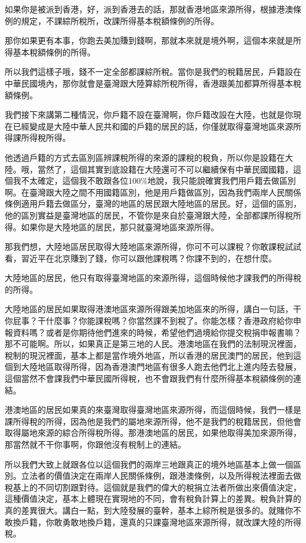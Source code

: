 \documentclass[oneside,sub3section]{ctexbook}
\begin{document}
如果你是被派到香港，好，派到香港去的話，那就香港地區來源所得，根據港澳條例的規定，不課綜所稅所，改課所得基本稅額條例的所得。

那你如果更有本事，你跑去美加賺到錢啊，那就本來就是境外啊，這個本來就是所得基本稅額條例的所得。

所以我們這樣子哦，錢不一定全部都課綜所稅。當你是我們的稅籍居民，戶籍設在中華民國境內，那你就會是臺灣跟大陸算綜所稅所得，香港跟美加都算所得基本稅額條例。

我們接下來講第二種情況，你戶籍不設在臺灣啊，你戶籍改設在大陸，也就是你現在已經變成是大陸中華人民共和國的戶籍的居民的話，你僅就取得臺灣地區來源所得課所得稅所得。

他透過戶籍的方式去區別區辨課稅所得的來源的課稅的稅負，所以你是設籍在大陸。哦，當然了，這個其實到底設籍在大陸還可不可以繼續保有中華民國國籍，這個我不太確定，這個我不敢跟各位100\%地說，我只能說確實我們用戶籍去做區別啊。在臺灣跟大陸之間不用國籍區別，他是用戶籍做區別，因為我們兩岸人民關係條例適用戶籍去做區分，臺灣的地區的居民跟大陸地區的居民。好，這個的區別，他的區別實益是臺灣地區的居民，不管你是來自於臺灣跟大陸，全部都課所得稅所得。如果你是大陸地區的居民，那只就臺灣地區來源所得。

那我們想，大陸地區居民取得大陸地區來源所得，你可不可以課稅？你敢課稅試試看，習近平在北京賺到了錢，你可以跟他課稅嗎？你課不到的，在想什麼。

大陸地區的居民，他只有取得臺灣地區的來源所得，這個時候他才課我們的所得稅的所得。

大陸地區的居民如果取得港澳地區來源所得跟美加地區來的所得，講白一句話，干你屁事？干什麼事？你能課稅嗎？你當然課不到稅了。你能怎樣？香港政府給你申報資料嗎？或者是你期待他們進來的時候，希望他們過境給你提交稅捐申報書嘛？那不可能啊。所以，如果真正是第三地的人民。港澳地區在我們的法制現況裡面，稅制的現況裡面，基本上都是當作境外地區，所以香港的居民澳門的居民，他到這個到大陸地區取得所得，因為香港澳門地區有很多人跑去他們北上進内陸去發展，這個當然不會課我們中華民國所得稅，也不會跟我們有什麼所得基本稅額條例的連結。

港澳地區的居民如果真的來臺灣取得臺灣地區來源所得，而這個時候，我們一樣是課所得稅的所得，因為他是我們的屬地來源所得，他不是我們的稅籍居民，但他會取得屬地來源的綜合所得稅所得。那港澳地區的居民，如果他取得美加來源所得，那當然就不干你事啊，你跟他沒有稅制上的連結。

所以我們大致上就跟各位以這個我們的兩岸三地跟真正的境外地區基本上做一個區別。立法者的價值決定在兩岸人民關係條例，跟港澳條例，以及所得稅法裡面去做稅基上的不同切割跟對待。這個就是我們的偉大的稅捐立法者所做出來價值決定，這種價值決定，基本上體現在實現地的不同，會有稅負計算上的差異。稅負計算的真的差異很大。講白一點，到大陸發展的臺幹，基本上綜所稅是很多的。就賭你不敢換戶籍，你敢勇敢地換戶籍，還真的只課臺灣地區來源所得，就改課大陸的所得稅。
\end{document}
